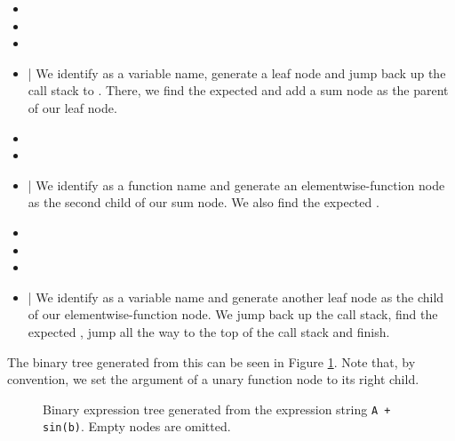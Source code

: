 \documentclass[12pt, a4paper]{report}
\begin{document}
\begin{itemize}
    \setlength\itemsep{0.01em}
    \item {}
    \item {}
    \item {}
    \item {} | We identify  as a variable name, generate a leaf node and jump back up the call stack to . There, we find the expected  and add a sum node as the parent of our leaf node.
    \item {}
    \item {}
    \item {} | We identify  as a function name and generate an elementwise-function node as the second child of our sum node. We also find the expected .
    \item {}
    \item {}
    \item {}
    \item {} | We identify  as a variable name and generate another leaf node as the child of our elementwise-function node. We jump back up the call stack, find the expected , jump all the way to the top of the call stack and finish.
\end{itemize}

The binary tree generated from this can be seen in Figure \ref{fig:tree_example}.
Note that, by convention, we set the argument of a unary function node to its right child.

\begin{figure}
    \centering
    \caption{Binary expression tree generated from the expression string \texttt{A + sin(b)}. Empty nodes are omitted.}
    \label{fig:tree_example}
\end{figure}
\end{document}
